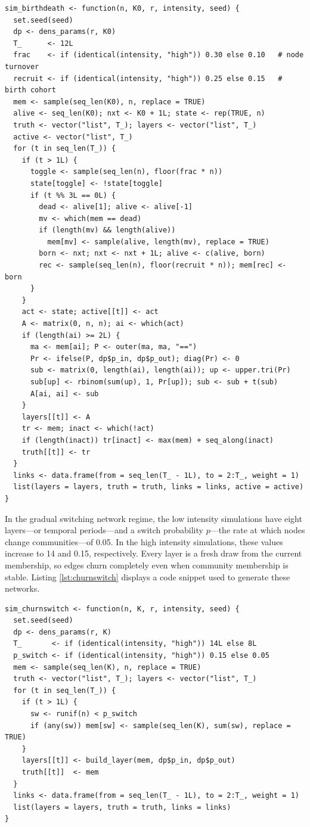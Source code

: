 \documentclass[11pt, letterpaper]{article}
\numberwithin{equation}{section}
\begin{document}
\begin{lstlisting}[caption={Births and deaths generator.},
                   label={lst:birthdeath}]
sim_birthdeath <- function(n, K0, r, intensity, seed) {
  set.seed(seed)
  dp <- dens_params(r, K0)
  T_      <- 12L
  frac    <- if (identical(intensity, "high")) 0.30 else 0.10   # node turnover
  recruit <- if (identical(intensity, "high")) 0.25 else 0.15   # birth cohort
  mem <- sample(seq_len(K0), n, replace = TRUE)
  alive <- seq_len(K0); nxt <- K0 + 1L; state <- rep(TRUE, n)
  truth <- vector("list", T_); layers <- vector("list", T_)
  active <- vector("list", T_)
  for (t in seq_len(T_)) {
    if (t > 1L) {
      toggle <- sample(seq_len(n), floor(frac * n))
      state[toggle] <- !state[toggle]
      if (t %% 3L == 0L) {
        dead <- alive[1]; alive <- alive[-1]
        mv <- which(mem == dead)
        if (length(mv) && length(alive))
          mem[mv] <- sample(alive, length(mv), replace = TRUE)
        born <- nxt; nxt <- nxt + 1L; alive <- c(alive, born)
        rec <- sample(seq_len(n), floor(recruit * n)); mem[rec] <- born
      }
    }
    act <- state; active[[t]] <- act
    A <- matrix(0, n, n); ai <- which(act)
    if (length(ai) >= 2L) {
      ma <- mem[ai]; P <- outer(ma, ma, "==")
      Pr <- ifelse(P, dp$p_in, dp$p_out); diag(Pr) <- 0
      sub <- matrix(0, length(ai), length(ai)); up <- upper.tri(Pr)
      sub[up] <- rbinom(sum(up), 1, Pr[up]); sub <- sub + t(sub)
      A[ai, ai] <- sub
    }
    layers[[t]] <- A
    tr <- mem; inact <- which(!act)
    if (length(inact)) tr[inact] <- max(mem) + seq_along(inact)
    truth[[t]] <- tr
  }
  links <- data.frame(from = seq_len(T_ - 1L), to = 2:T_, weight = 1)
  list(layers = layers, truth = truth, links = links, active = active)
}
\end{lstlisting}


In the gradual switching network regime, the low intensity simulations have eight layers---or temporal periods---and a switch probability $p$---the rate at which nodes change communities---of 0.05. In the high intensity simulations, these values increase to 14 and 0.15, respectively. Every layer is a fresh draw from the current membership, so edges churn completely even when community membership is stable. Listing \ref{lst:churnswitch} displays a code snippet used to generate these networks.

\begin{lstlisting}[caption={Gradual switching generator.},
                   label={lst:churnswitch}]
sim_churnswitch <- function(n, K, r, intensity, seed) {
  set.seed(seed)
  dp <- dens_params(r, K)
  T_       <- if (identical(intensity, "high")) 14L else 8L
  p_switch <- if (identical(intensity, "high")) 0.15 else 0.05
  mem <- sample(seq_len(K), n, replace = TRUE)
  truth <- vector("list", T_); layers <- vector("list", T_)
  for (t in seq_len(T_)) {
    if (t > 1L) {
      sw <- runif(n) < p_switch
      if (any(sw)) mem[sw] <- sample(seq_len(K), sum(sw), replace = TRUE)
    }
    layers[[t]] <- build_layer(mem, dp$p_in, dp$p_out)
    truth[[t]]  <- mem
  }
  links <- data.frame(from = seq_len(T_ - 1L), to = 2:T_, weight = 1)
  list(layers = layers, truth = truth, links = links)
}
\end{lstlisting}
\end{document}
